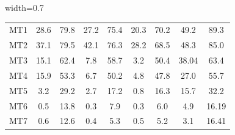 \begin{table}[H]
\begin{adjustbox}{width=0.7\textwidth}
\begin{tabular}{@{}c|cc|cc|cc|cc@{}}
\hline
MT1 & 28.6 & 79.8 & 27.2 & 75.4 & 20.3 & 70.2 & 49.2 & 89.3 \\
MT2 & 37.1 & 79.5 & 42.1 & 76.3 & 28.2 & 68.5 & 48.3 & 85.0 \\
MT3 & 15.1 & 62.4 & 7.8 & 58.7 & 3.2 & 50.4 & 38.04 & 63.4 \\
MT4 & 15.9 & 53.3 & 6.7 & 50.2 & 4.8 & 47.8 & 27.0 & 55.7 \\
MT5 & 3.2 & 29.2 & 2.7 & 17.2 & 0.8 & 16.3 & 15.7 & 32.2 \\
MT6 & 0.5 & 13.8 & 0.3 & 7.9 & 0.3 & 6.0 & 4.9 & 16.19 \\
MT7 & 0.6 & 12.6 & 0.4 & 5.3 & 0.5 & 5.2 & 3.1 & 16.41 \\
\hline
\end{tabular}
\end{adjustbox}
\end{table}